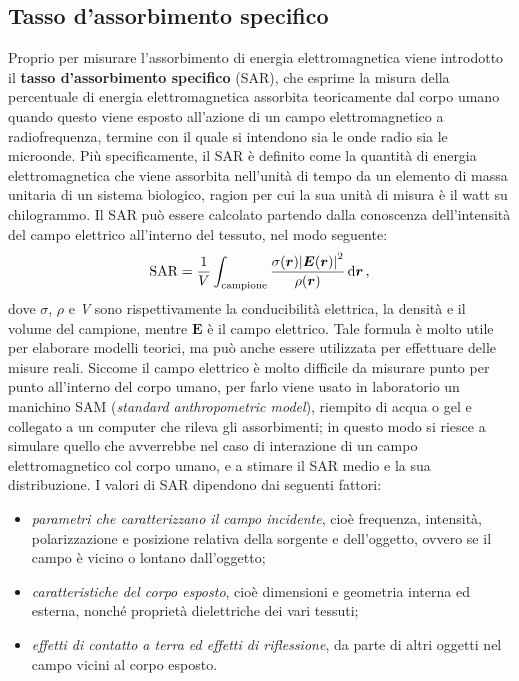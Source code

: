 \documentclass{report}
\numberwithin{equation}{section}
\numberwithin{figure}{section}
\renewcommand{\Vec}{\bm}
\begin{document}
\subsection{Tasso d'assorbimento specifico}
Proprio per misurare l'assorbimento di energia elettromagnetica viene introdotto il \textbf{tasso d'assorbimento specifico} (SAR), che esprime la misura della percentuale di energia elettromagnetica assorbita teoricamente dal corpo umano quando questo viene esposto all'azione di un campo elettromagnetico a radiofrequenza, termine con il quale si intendono sia le onde radio sia le microonde. Più specificamente, il SAR è definito come la quantità di energia elettromagnetica che viene assorbita nell'unità di tempo da un elemento di massa unitaria di un sistema biologico, ragion per cui la sua unità di misura è il watt su chilogrammo. Il SAR può essere calcolato partendo dalla conoscenza dell'intensità del campo elettrico all'interno del tessuto, nel modo seguente:
\begin{equation}
    \text{SAR} = \frac{1}{V}\int_\mathrm{campione}\frac{\sigma(\Vec{r})\abs{\Vec{E}(\Vec{r})}^2}{\rho(\Vec{r})}\,\mathrm{d}\Vec{r}\,,
\end{equation}
dove $\sigma$, $\rho$ e \textit{V} sono rispettivamente la conducibilità elettrica, la densità e il volume del campione, mentre $\Vec{E}$ è il campo elettrico. Tale formula è molto utile per elaborare modelli teorici, ma può anche essere utilizzata per effettuare delle misure reali. Siccome il campo elettrico è molto difficile da misurare punto per punto all'interno del corpo umano, per farlo viene usato in laboratorio un manichino SAM (\textit{standard anthropometric model}), riempito di acqua o gel e collegato a un computer che rileva gli assorbimenti; in questo modo si riesce a simulare quello che avverrebbe nel caso di interazione di un campo elettromagnetico col corpo umano, e a stimare il SAR medio e la sua distribuzione. I valori di SAR dipendono dai seguenti fattori:
\begin{itemize}[label=$-$]
    \item \emph{parametri che caratterizzano il campo incidente}, cioè frequenza, intensità, polarizzazione e posizione relativa della sorgente e dell'oggetto, ovvero se il campo è vicino o lontano dall'oggetto;
    \item \emph{caratteristiche del corpo esposto}, cioè dimensioni e geometria interna ed esterna, nonché proprietà dielettriche dei vari tessuti;
    \item \emph{effetti di contatto a terra ed effetti di riflessione}, da parte di altri oggetti nel campo vicini al corpo esposto.
\end{itemize}
\end{document}
